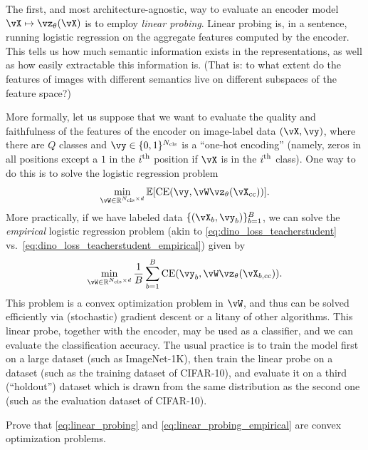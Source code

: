 \documentclass[../../book-main.tex]{subfiles}
\begin{document}
The first, and most architecture-agnostic, way to evaluate an encoder model \(\vX \mapsto \vz_{\theta}(\vX)\) is to employ \textit{linear probing}. Linear probing is, in a sentence, running logistic regression on the aggregate features computed by the encoder. This tells us how much semantic information exists in the representations, as well as how easily extractable this information is. (That is: to what extent do the features of images with different semantics live on different subspaces of the feature space?)

More formally, let us suppose that we want to evaluate the quality and faithfulness of the features of the encoder on image-label data \((\vX, \vy)\), where there are \(Q\) classes and \(\vy \in \{0, 1\}^{N_{\cls}}\) is a ``one-hot encoding'' (namely, zeros in all positions except a \(1\) in the \(i^{\textnormal{th}}\) position if \(\vX\) is in the \(i^{\textnormal{th}}\) class). One way to do this is to solve the logistic regression problem 
\begin{equation}\label{eq:linear_probing}
    \min_{\vW \in \R^{N_{\cls} \times d}}\Ex[\CE(\vy, \vW \vz_{\theta}(\vX_{\cc}))].
\end{equation}
More practically, if we have labeled data \(\{(\vX_{b}, \vy_{b})\}_{b = 1}^{B}\), we can solve the \textit{empirical} logistic regression problem (akin to \eqref{eq:dino_loss_teacherstudent} vs.~\eqref{eq:dino_loss_teacherstudent_empirical}) given by 
\begin{equation}\label{eq:linear_probing_empirical}
    \min_{\vW \in \R^{N_{\cls} \times d}}\frac{1}{B}\sum_{b = 1}^{B}\CE(\vy_{b}, \vW \vz_{\theta}(\vX_{b, \cc})).
\end{equation}
This problem is a convex optimization problem in \(\vW\), and thus can be solved efficiently via (stochastic) gradient descent or a litany of other algorithms. This linear probe, together with the encoder, may be used as a classifier, and we can evaluate the classification accuracy. The usual practice is to train the model first on a large dataset (such as ImageNet-1K), then train the linear probe on a dataset (such as the training dataset of CIFAR-10), and evaluate it on a third (``holdout'') dataset which is drawn from the same distribution as the second one (such as the evaluation dataset of CIFAR-10).

\begin{exercise}
    Prove that \eqref{eq:linear_probing} and \eqref{eq:linear_probing_empirical} are convex optimization problems.
\end{exercise}
\end{document}
